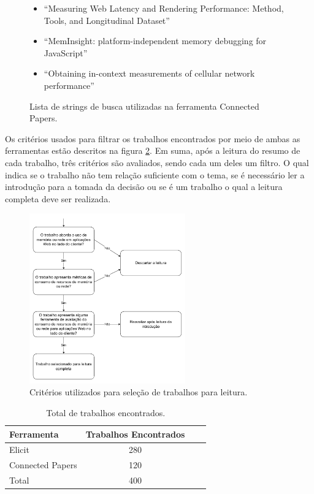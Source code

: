 \documentclass[12pt]{tcc}
\begin{document}
\begin{figure}
	\centering
	\caption{Lista de strings de busca utilizadas na ferramenta Connected Papers.}
	\begin{minipage}{0.6\textwidth}
	    \begin{itemize}
			\item ``Measuring Web Latency and Rendering Performance: Method, Tools, and Longitudinal Dataset''
			\item ``MemInsight: platform-independent memory debugging for JavaScript''
			\item ``Obtaining in-context measurements of cellular network performance''
	    \end{itemize}
	\end{minipage}
	\label{tab:connected-papers}
\end{figure}

Os critérios usados para filtrar os trabalhos encontrados por meio de ambas as ferramentas estão descritos na figura \ref{fig:fluxo-leitura}.
Em suma, após a leitura do resumo de cada trabalho, três critérios são avaliados, sendo cada um deles um filtro.
O qual indica se o trabalho não tem relação suficiente com o tema, se é necessário ler a introdução para a tomada da decisão ou se é um trabalho o qual a leitura completa deve ser realizada.

\begin{figure}[!ht]
	\centering
	\includegraphics[width=0.6\textwidth]{figures/fluxo-decisao-leitura.pdf}
	\caption{Critérios utilizados para seleção de trabalhos para leitura.}
	\label{fig:fluxo-leitura}
\end{figure}

\begin{table}[!ht]
	\centering
	\caption{Total de trabalhos encontrados.}
	\begin{tabular}{l  c L{1.5cm} R{1.5cm}}
		\toprule
		\textbf{Ferramenta} & \textbf{Trabalhos Encontrados} \\
		\midrule
		Elicit  &  280  \\
		Connected Papers  &  120  \\
		\midrule
		Total  &  400  \\
		\bottomrule
	\end{tabular}
	\label{tab:trabalhos-encontrados}
\end{table}
\end{document}
